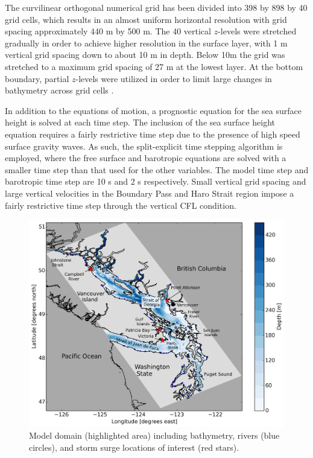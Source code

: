 \documentclass[pdftex,10pt]{article}
\begin{document}
The curvilinear orthogonal numerical grid has been divided into 398 by 898 by 40 grid cells, which results in an almost uniform horizontal resolution with grid spacing approximately 440 m by 500 m. The 40 vertical $z$-levels were stretched gradually in order to achieve higher resolution in the surface layer, with 1 m vertical grid spacing down to about 10 m in depth. Below 10m the grid was stretched to a maximum grid spacing of 27 m at the lowest layer. At the bottom boundary, partial $z$-levels were utilized in order to limit large changes in bathymetry across grid cells \citep{madec2012nemo}. 

In addition to the equations of motion, a prognostic equation for the sea surface height is solved at each time step. The inclusion of the sea surface height equation requires a fairly restrictive time step due to the presence of high speed surface gravity waves. As such, the split-explicit time stepping algorithm is employed, where the free surface and barotropic equations are solved with a smaller time step than that used for the other variables. The model time step and barotropic time step are 10 s and 2 s respectively. Small vertical grid spacing and large vertical velocities in the Boundary Pass and Haro Strait region impose a fairly restrictive time step through the vertical CFL condition.


\begin{figure}[h]
\centering
\includegraphics[scale=0.5]{Figures/bathy.pdf}
\caption{Model domain (highlighted area) including bathymetry, rivers (blue circles), and storm surge locations of interest  (red stars).}\label{fig:domain}
\end{figure}
\end{document}
